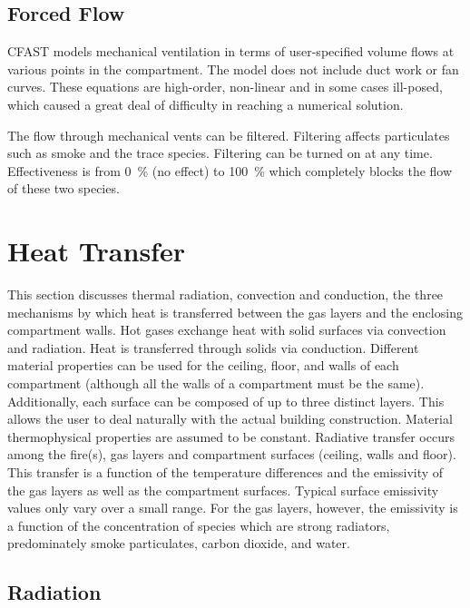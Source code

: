 \section{Forced Flow}

CFAST models mechanical ventilation in terms of user-specified volume flows at various points in the compartment. The model does not include duct work or fan curves. These equations are high-order, non-linear and in some cases ill-posed, which caused a great deal of difficulty in reaching a numerical solution.

The flow through mechanical vents can be filtered. Filtering affects particulates such as smoke and the trace species. Filtering can be turned on at any time. Effectiveness is from 0~\% (no effect) to 100~\% which completely blocks the flow of these two species.





\chapter{Heat Transfer}

This section discusses thermal radiation, convection and conduction, the three mechanisms by which heat is transferred between the gas layers and the enclosing compartment walls. Hot gases exchange heat with solid surfaces via convection and radiation. Heat is transferred through solids via conduction. Different material properties can be used for the ceiling, floor, and walls of each compartment (although all the walls of a compartment must be the same).  Additionally, each surface can be composed of up to three distinct layers.  This allows the user to deal naturally with the actual building construction.  Material thermophysical properties are assumed to be constant. Radiative transfer occurs among the fire(s), gas layers and compartment surfaces (ceiling, walls and floor).  This transfer is a function of the temperature differences and the emissivity of the gas layers as well as the compartment surfaces.  Typical surface emissivity values only vary over a small range.  For the gas layers, however, the emissivity is a function of the concentration of species which are strong radiators, predominately smoke particulates, carbon dioxide, and water.

\section{Radiation}
\label{sec:Radiation}

